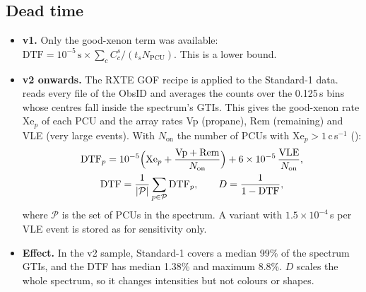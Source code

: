 \subsection{Dead time}\label{sec:deadtime}
\begin{itemize}
\item \textbf{v1.} Only the good-xenon term was available: $\mathrm{DTF}=10^{-5}\,\mathrm{s}\times\sum_cC^s_c/(t_sN_\mathrm{PCU})$.
This is a lower bound.
\item \textbf{v2 onwards.} The RXTE GOF recipe is applied to the Standard-1 data.  reads every
 file of the ObsID and averages the counts over the 0.125\,s bins whose centres fall inside the spectrum's GTIs.
This gives the good-xenon rate $\mathrm{Xe}_p$ of each PCU and the array rates Vp (propane), Rem (remaining) and VLE (very
large events). With $N_\mathrm{on}$ the number of PCUs with $\mathrm{Xe}_p>1$\,c\,s$^{-1}$ ():
\begin{equation}
\begin{gathered}
\mathrm{DTF}_p = 10^{-5}\Bigl(\mathrm{Xe}_p+\frac{\mathrm{Vp}+\mathrm{Rem}}{N_\mathrm{on}}\Bigr)+6\times10^{-5}\,\frac{\mathrm{VLE}}{N_\mathrm{on}},\\
\mathrm{DTF}=\frac{1}{|\mathcal P|}\sum_{p\in\mathcal P}\mathrm{DTF}_p,\qquad D=\frac{1}{1-\mathrm{DTF}},
\end{gathered}\label{eq:dtf}
\end{equation}
where $\mathcal P$ is the set of PCUs in the spectrum. A variant with $1.5\times10^{-4}$\,s per VLE event is stored as
 for sensitivity only.
\item \textbf{Effect.} In the v2 sample, Standard-1 covers a median 99\% of the spectrum GTIs, and the DTF has median
1.38\% and maximum 8.8\%. $D$ scales the whole spectrum, so it changes intensities but not colours or shapes.
\end{itemize}

